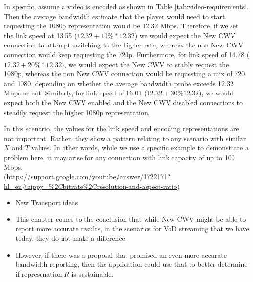 \documentclass[10pt,sigconf]{acmart}
\begin{document}
In specific, assume a video is encoded as shown in Table \ref{tab:video-requirements}. Then the average bandwidth estimate that the player would need to start requesting the 1080p representation would be 12.32 Mbps. Therefore, if we set the link speed at 13.55 ($12.32 + 10\% * 12.32$) we would expect the New CWV connection to attempt switching to the higher rate, whereas the non New CWV connection would keep requesting the 720p. Furthermore, for link speed of 14.78 ($12.32 + 20\%*12.32$), we would expect the New CWV to stably request the 1080p, whereas the non New CWV connection would be requesting a mix of 720 and 1080, depending on whether the average bandwidth probe exceeds 12.32 Mbps or not. Similarly, for link speed of 16.01 ($12.32 + 30\% 12.32$), we would expect both the New CWV enabled and the New CWV disabled connections to steadily request the higher 1080p representation. 

In this scenario, the values for the link speed and encoding representations are not important. Rather, they show a pattern relating to any scenario with similar $X$ and $T$ values. In other words, while we use a specific example to demonstrate a problem here, it may arise for any connection with link capacity of up to 100 Mbps. \\(\url{https://support.google.com/youtube/answer/1722171?hl=en#zippy=%2Cbitrate%2Cresolution-and-aspect-ratio})

\begin{itemize}
    \item New Transport ideas
    \item This chapter comes to the conclusion that while New CWV might be able to report more accurate results, in the scenarios for VoD streaming that we have today, they do not make a difference.
    \item However, if there was a proposal that promised an even more accurate bandwidth reporting, then the application could use that to better determine if represenation $R$ is sustainable.
\end{itemize}


\end{document}
